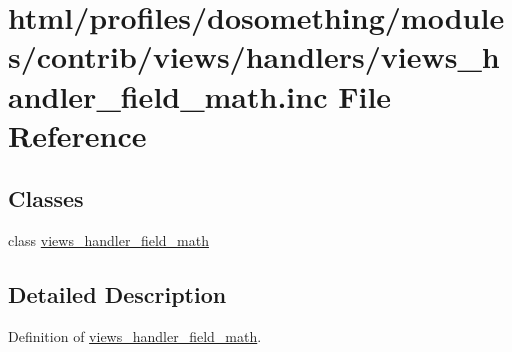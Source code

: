 \hypertarget{views__handler__field__math_8inc}{
\section{html/profiles/dosomething/modules/contrib/views/handlers/views\_\-handler\_\-field\_\-math.inc File Reference}
\label{views__handler__field__math_8inc}
}
\subsection*{Classes}
\begin{DoxyCompactItemize}
\item 
class \hyperlink{classviews__handler__field__math}{views\_\-handler\_\-field\_\-math}
\end{DoxyCompactItemize}


\subsection{Detailed Description}
Definition of \hyperlink{classviews__handler__field__math}{views\_\-handler\_\-field\_\-math}. 